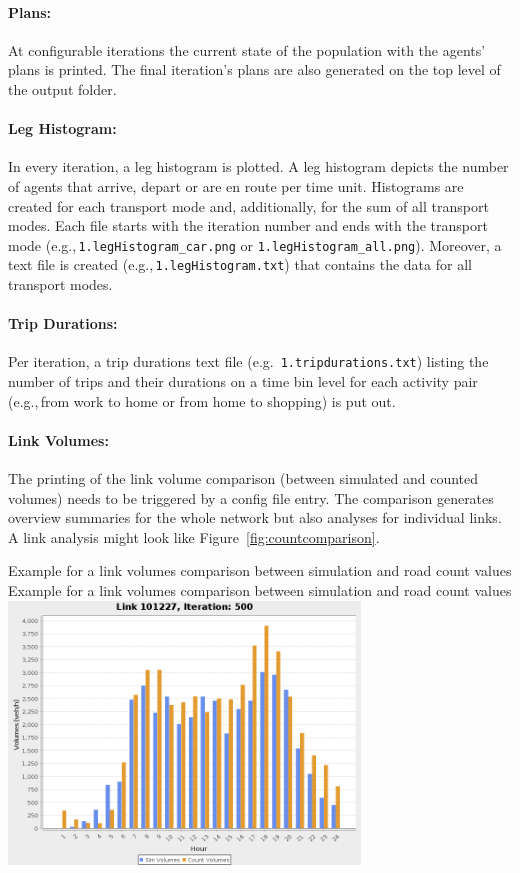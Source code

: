\paragraph{Plans:} At configurable iterations the current state of the population with the agents' plans is printed.
%
The final iteration's plans 
are also generated on the top level of the output folder.

\paragraph{Leg Histogram:}
In every iteration, a leg histogram is plotted. A leg histogram depicts the number of agents that arrive, depart or are en route per time unit. Histograms are created for each transport mode and, additionally, for the sum of all transport modes. Each file starts with the iteration number and ends with the transport mode (e.g.,\,\lstinline|1.legHistogram_car.png| or \lstinline|1.legHistogram_all.png|). Moreover, a text file is created (e.g.,\,\lstinline|1.legHistogram.txt|) that contains the data for all transport modes.

\paragraph{Trip Durations:}
Per iteration, a \gls{trip} durations text file (e.g.\ \lstinline|1.tripdurations.txt|) listing the number of trips and their durations on a time bin level for each activity pair (e.g.,\,from work to home or from home to shopping) is put out.

\paragraph{Link Volumes:}
The printing of the link volume comparison (between simulated and counted volumes) needs to be triggered by a config file entry. The comparison generates overview summaries for the whole network but also analyses for individual links. A link analysis might look like Figure~\ref{fig:countcomparison}.

\createfigure%
{Example for a link volumes comparison between simulation and road count values}%
{Example for a link volumes comparison between simulation and road count values}%
{\label{fig:countcomparison}}%
{\includegraphics[width=0.7\textwidth, angle=0]{using/figures/link101227.png}}%
{}


